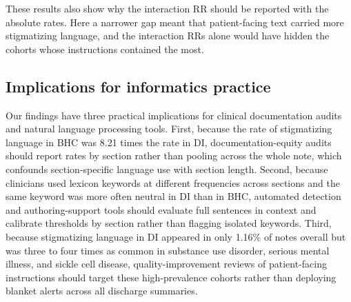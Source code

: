 \documentclass[unnumsec,webpdf,contemporary,large]{oup-authoring-template}
\newcommand{\td}[1]{\sethlcolor{pink}\hl{[Ting: #1]}}
\begin{document}
These results also show why the interaction RR should be reported with the absolute rates. Here a narrower gap meant that patient-facing text carried more stigmatizing language, and the interaction RRs alone would have hidden the cohorts whose instructions contained the most.

\subsection{Implications for informatics practice}

Our findings have three practical implications for clinical documentation audits and natural language processing tools.\cite{himmelstein2022,walker2025,scroggins2025} First, because the rate of stigmatizing language in BHC was 8.21 times the rate in DI, documentation-equity audits should report rates by section rather than pooling across the whole note, which confounds section-specific language use with section length. Second, because clinicians used lexicon keywords at different frequencies across sections and the same keyword was more often neutral in DI than in BHC, automated detection and authoring-support tools should evaluate full sentences in context and calibrate thresholds by section rather than flagging isolated keywords. Third, because stigmatizing language in DI appeared in only 1.16\% of notes overall but was three to four times as common in substance use disorder, serious mental illness, and sickle cell disease, quality-improvement reviews of patient-facing instructions should target these high-prevalence cohorts rather than deploying blanket alerts across all discharge summaries.

\end{document}
